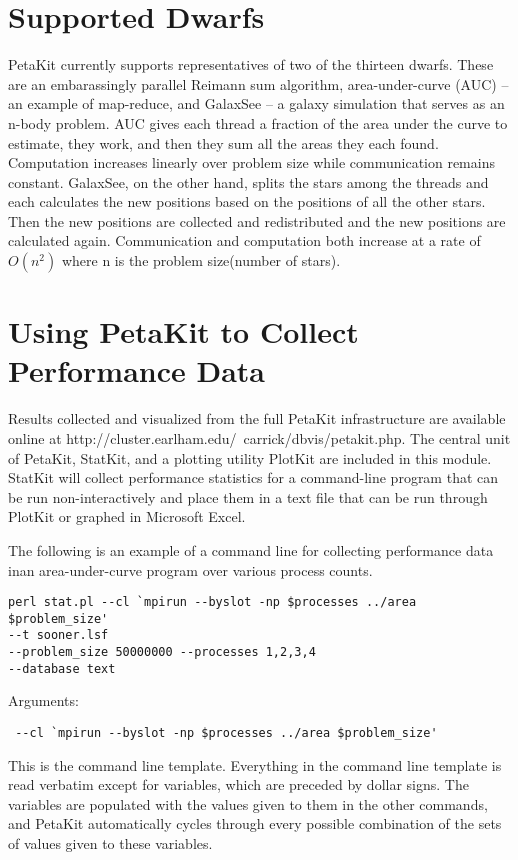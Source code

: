\documentclass[12pt]{article}
\begin{document}
\section{Supported Dwarfs}
PetaKit currently supports representatives of two of the thirteen dwarfs\cite{Dwarfs}. These are an embarassingly parallel Reimann sum algorithm, area-under-curve (AUC) -- an example of map-reduce, and GalaxSee -- a galaxy simulation that serves as an n-body problem. AUC gives each thread a fraction of the area under the curve to estimate, they work, and then they sum all the areas they each found. Computation increases linearly over problem size while communication remains constant. GalaxSee, on the other hand, splits the stars among the threads and each calculates the new positions based on the positions of all the other stars. Then the new positions are collected and redistributed and the new positions are calculated again. Communication and computation both increase at a rate of $O(n^2)$ where n is the problem size(number of stars).

\section{Using PetaKit to Collect Performance Data}
	Results collected and visualized from the full PetaKit infrastructure are available online at http://cluster.earlham.edu/~carrick/dbvis/petakit.php. The central unit of PetaKit, StatKit, and a plotting utility PlotKit are included in this module. StatKit will collect performance statistics for a command-line program that can be run non-interactively and place them in a text file that can be run through PlotKit or graphed in Microsoft Excel.

The following is an example of a command line for collecting performance data inan area-under-curve program over various process counts. 
\begin{verbatim}
perl stat.pl --cl `mpirun --byslot -np $processes ../area $problem_size'
--t sooner.lsf
--problem_size 50000000 --processes 1,2,3,4
--database text
\end{verbatim}

Arguments:
\begin{verbatim} --cl `mpirun --byslot -np $processes ../area $problem_size'\end{verbatim}
This is the command line template. Everything in the command line template is read verbatim except for variables, which are preceded by dollar signs. The variables are populated with the values given to them in the other commands, and PetaKit automatically cycles through every possible combination of the sets of values given to these variables.
\end{document}
